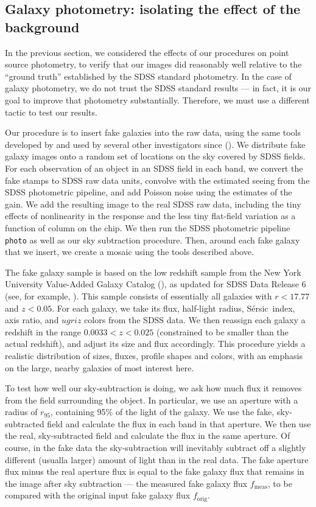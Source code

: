 \documentclass[10pt,preprint]{aastex}
\newcommand{\Sersic}{S\'ersic}
\begin{document}
\subsection{Galaxy photometry: isolating the effect of the background}
\label{sec:simplegal}

In the previous section, we considered the effects of our procedures
on point source photometry, to verify that our images did reasonably
well relative to the ``ground truth'' established by the SDSS standard
photometry.  In the case of galaxy photometry, we do not trust the
SDSS standard results --- in fact, it is our goal to improve that
photometry substantially.  Therefore, we must use a different tactic
to test our results.

Our procedure is to insert fake galaxies into the raw data, using the
same tools developed by \citet{blanton05b} and used by several other
investigators since (\citealt{blanton04b, mandelbaum06a, masjedi06a}).
We distribute fake galaxy images onto a random set of locations on the
sky covered by SDSS fields. For each observation of an object in an
SDSS field in each band, we convert the fake stamps to SDSS raw data
units, convolve with the estimated seeing from the SDSS photometric
pipeline, and add Poisson noise using the estimates of the gain. We
add the resulting image to the real SDSS raw data, including the tiny
effects of nonlinearity in the response and the less tiny flat-field
variation as a function of column on the chip. We then run the SDSS
photometric pipeline {\tt photo} as well as our sky subtraction
procedure. Then, around each fake galaxy that we insert, we create a
mosaic using the tools described above.

The fake galaxy sample is based on the low redshift sample from the
New York University Value-Added Galaxy Catalog (\citealt{blanton05a}),
as updated for SDSS Data Release 6 (see, for example,
\citealt{zhu10a}). This sample consists of essentially all galaxies
with $r<17.77$ and $z<0.05$.  For each galaxy, we take its flux,
half-light radius, \Sersic\ index, axis ratio, and $ugriz$ colors from
the SDSS data. We then reassign each galaxy a redshift in the range
$0.0033<z<0.025$ (constrained to be smaller than the actual
redshift), and adjust its size and flux accordingly.  This procedure
yields a realistic distribution of sizes, fluxes, profile shapes and
colors, with an emphasis on the large, nearby galaxies of most
interest here. 

To test how well our sky-subtraction is doing, we ask how much flux it
removes from the field surrounding the object. In particular, we use
an aperture with a radius of $r_{95}$, containing 95\% of the light of
the galaxy.  We use the fake, sky-subtracted field and calculate the
flux in each band in that aperture.  We then use the real,
sky-subtracted field and calculate the flux in the same aperture.  Of
course, in the fake data the sky-subtraction will inevitably subtract
off a slightly different (usualla larger) amount of light than in the
real data. The fake aperture flux minus the real aperture flux is
equal to the fake galaxy flux that remains in the image after sky
subtraction --- the measured fake galaxy flux $f_{\mathrm{meas}}$, to
be compared with the original input fake galaxy flux
$f_{\mathrm{orig}}$.
\end{document}
